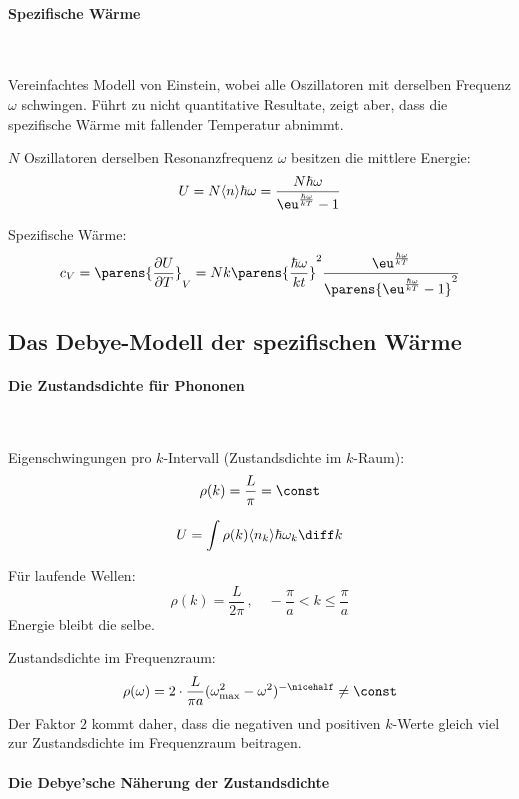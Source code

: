		\paragraph{Spezifische Wärme} %
			~
			
			Vereinfachtes Modell von Einstein, wobei alle Oszillatoren mit derselben Frequenz $\omega$ schwingen.
			Führt zu nicht quantitative Resultate, zeigt aber, dass die spezifische Wärme mit fallender Temperatur abnimmt.
			
			$N$ Oszillatoren derselben Resonanzfrequenz $\omega$ besitzen die mittlere Energie:
			\[
				U = N \langle n \rangle \hbar \omega = \frac{N \hbar \omega}{\eu^{\frac{\hbar\omega}{kT}} - 1}
			\]
			
			Spezifische Wärme:
			\[
				c_V = \parens{\frac{\partial U}{\partial T}}_V = N k \parens{\frac{\hbar\omega}{kt}}^2 \frac{\eu^{\frac{\hbar\omega}{kT}}}{\parens{\eu^{\frac{\hbar\omega}{kT}} - 1}^2}
			\]
	\subsection{Das Debye-Modell der spezifischen Wärme} %
		\paragraph{Die Zustandsdichte für Phononen} %
			~
			
			Eigenschwingungen pro $k$-Intervall (Zustandsdichte im $k$-Raum):
			\[
				\rho (k) = \frac L \pi = \const
			\]
			
			\[
				U = \int \rho(k) \langle n_k \rangle \hbar \omega_k \diff k
			\]
			
			Für laufende Wellen:
			\[
				\rho(k) = \frac L {2\pi} \,,\quad -\frac \pi a < k \le \frac \pi a
			\]
			Energie bleibt die selbe.
			
			Zustandsdichte im Frequenzraum:
			\[
				\rho(\omega) = 2 \cdot \frac L {\pi a} (\omega_\text{max}^2 - \omega^2)^{-\nicehalf} \neq \const
			\]
			Der Faktor $2$ kommt daher, dass die negativen und positiven $k$-Werte gleich viel zur Zustandsdichte im Frequenzraum beitragen.
		\paragraph{Die Debye'sche Näherung der Zustandsdichte} %
			~
			
